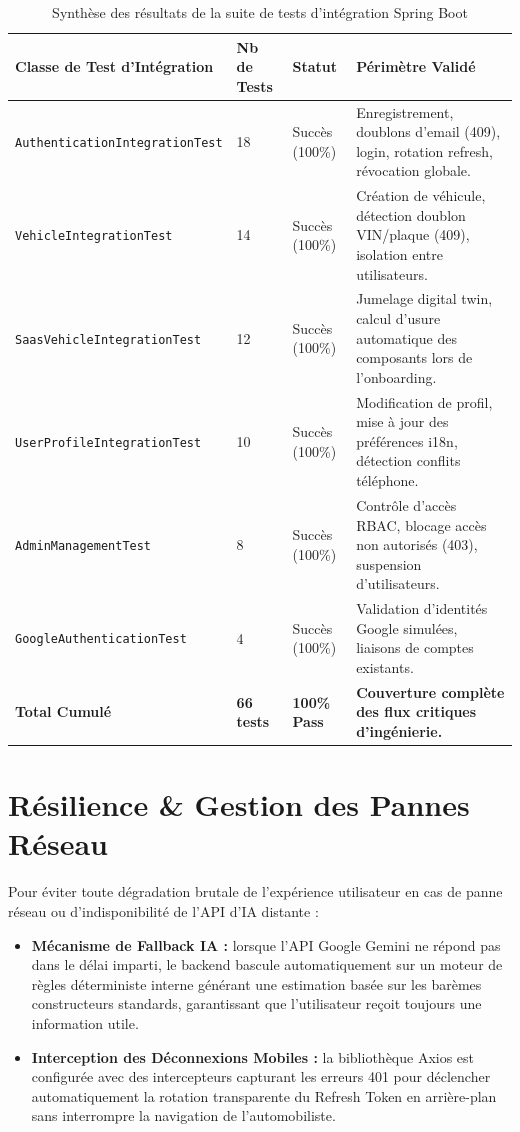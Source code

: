 \documentclass[12pt,a4paper,twoside,openright]{report}
\newcommand{\itembullet}{\textcolor{secondaryBlue}{$\blacktriangleright$}}
\begin{document}
  \begin{table}[H]
  \centering
  \small
  \begin{tabularx}{\textwidth}{p{4.2cm} p{2.2cm} p{2.0cm} X}
  \toprule
  \textbf{Classe de Test d'Int\'egration} & \textbf{Nb de Tests} & \textbf{Statut} & \textbf{P\'erim\`etre Valid\'e} \\
  \midrule
  \texttt{AuthenticationIntegrationTest} & 18 & Succ\`es (100\%) & Enregistrement, doublons d'email (409), login, rotation refresh, r\'evocation globale. \\
  \addlinespace
  \texttt{VehicleIntegrationTest} & 14 & Succ\`es (100\%) & Cr\'eation de v\'ehicule, d\'etection doublon VIN/plaque (409), isolation entre utilisateurs. \\
  \addlinespace
  \texttt{SaasVehicleIntegrationTest} & 12 & Succ\`es (100\%) & Jumelage digital twin, calcul d'usure automatique des composants lors de l'onboarding. \\
  \addlinespace
  \texttt{UserProfileIntegrationTest} & 10 & Succ\`es (100\%) & Modification de profil, mise \`a jour des pr\'ef\'erences i18n, d\'etection conflits t\'el\'ephone. \\
  \addlinespace
  \texttt{AdminManagementTest} & 8 & Succ\`es (100\%) & Contr\^ole d'acc\`es RBAC, blocage acc\`es non autoris\'es (403), suspension d'utilisateurs. \\
  \addlinespace
  \texttt{GoogleAuthenticationTest} & 4 & Succ\`es (100\%) & Validation d'identit\'es Google simul\'ees, liaisons de comptes existants. \\
  \midrule
  \textbf{Total Cumul\'e} & \textbf{66 tests} & \textbf{100\% Pass} & \textbf{Couverture compl\`ete des flux critiques d'ing\'enierie.} \\
  \bottomrule
  \end{tabularx}
  \caption{Synth\`ese des r\'esultats de la suite de tests d'int\'egration Spring Boot}
  \label{tab:test_results}
  \end{table}

  \section{R\'esilience \& Gestion des Pannes R\'eseau}
  Pour \'eviter toute d\'egradation brutale de l'exp\'erience utilisateur en cas de panne r\'eseau ou d'indisponibilit\'e de l'API d'IA distante :
  \begin{itemize}[label=\itembullet]
    \item \textbf{M\'ecanisme de Fallback IA :} lorsque l'API Google Gemini ne r\'epond pas dans le d\'elai imparti, le backend bascule automatiquement sur un moteur de r\`egles d\'eterministe interne g\'en\'erant une estimation bas\'ee sur les bar\`emes constructeurs standards, garantissant que l'utilisateur re\c{c}oit toujours une information utile.
    \item \textbf{Interception des D\'econnexions Mobiles :} la biblioth\`eque Axios est configur\'ee avec des intercepteurs capturant les erreurs 401 pour d\'eclencher automatiquement la rotation transparente du Refresh Token en arri\`ere-plan sans interrompre la navigation de l'automobiliste.
  \end{itemize}
\end{document}
